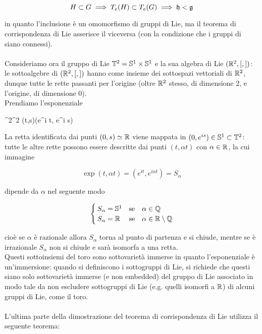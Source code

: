 \begin{equation}
	H \subset G \implies T_{e}(H) \subset T_{e}(G) \implies \mathfrak{h} < \mathfrak{g}
\end{equation}

in quanto l'inclusione è un omomorfismo di gruppi di Lie, ma il teorema di corrispondenza di Lie asserisce il viceversa (con la condizione che i gruppi di siano connessi).\\\\
%
Consideriamo ora il gruppo di Lie $ \mathbb{T}^{2} = \mathbb{S}^{1} \times \mathbb{S}^{1} $ e la sua algebra di Lie $ (\mathbb{R}^{2},[,]) $: le sottoalgebre di $ (\mathbb{R}^{2},[,]) $ hanno come insieme dei sottospazi vettoriali di $ \mathbb{R}^{2} $, dunque tutte le rette passanti per l'origine (oltre $ \mathbb{R}^{2} $ stesso, di dimensione 2, e l'origine, di dimensione 0).\\
Prendiamo l'esponenziale

\map{\exp}%
	{\R^{2}}{\T^{2}}%
	{(t,s)}{(e^{i t}, e^{i s})}

La retta identificata dai punti $ (0,s) \simeq \mathbb{R} $ viene mappata in $ (0,e^{i s}) \in \mathbb{S}^{1} \subset \mathbb{T}^{2} $: tutte le altre rette possono essere descritte dai punti $ (t,\alpha t) $ con $ \alpha \in \mathbb{R} $, la cui immagine

\begin{equation}
	\exp(t,\alpha t) = (e^{i t}, e^{i \alpha t}) = S_{\alpha}
\end{equation}

dipende da $ \alpha $ nel seguente modo

\begin{equation}
	\begin{cases}
		S_{\alpha} = \S^{1} & \qq*{se} \alpha \in \Q\\
		S_{\alpha} = \R & \qq*{se} \alpha \in \R \setminus \Q
	\end{cases}
\end{equation}

cioè se $ \alpha $ è razionale allora $ S_{\alpha} $ torna al punto di partenza e si chiude, mentre se è irrazionale $ S_{\alpha} $ non si chiude e sarà isomorfa a una retta.\\
Questi sottoinsiemi del toro sono sottovarietà immerse in quanto l'esponenziale è un'immersione: quando si definiscono i sottogruppi di Lie, si richiede che questi siano solo sottovarietà immerse (e non embedded) del gruppo di Lie associato in modo tale da non escludere sottogruppi di Lie (e.g. quelli isomorfi a $ \mathbb{R} $) di alcuni gruppi di Lie, come il toro.\\\\
%
L'ultima parte della dimostrazione del teorema di corrispondenza di Lie utilizza il seguente teorema:

